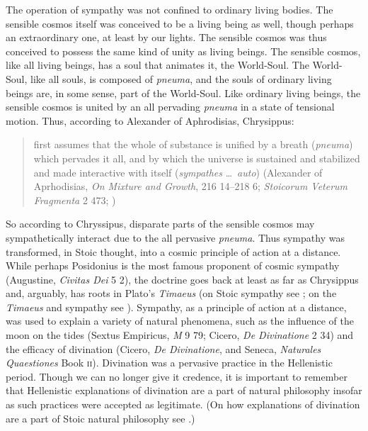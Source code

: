 The operation of sympathy was not confined to ordinary living bodies. The sensible cosmos itself was conceived to be a living being as well, though perhaps an extraordinary one, at least by our lights. The sensible cosmos was thus conceived to possess the same kind of unity as living beings. The sensible cosmos, like all living beings, has a soul that animates it, the World-Soul. The World-Soul, like all souls, is composed of \emph{pneuma}, and the souls of ordinary living beings are, in some sense, part of the World-Soul. Like ordinary living beings, the sensible cosmos is united by an all pervading \emph{pneuma} in a state of tensional motion. Thus, according to Alexander of Aphrodisias, Chrysippus: 
\begin{quote}
	first assumes that the whole of substance is unified by a breath (\emph{pneuma}) which pervades it all, and by which the universe is sustained and stabilized and made interactive with itself (\emph{sympathes} \ldots\ \emph{auto}) (Alexander of Aprhodisias, \emph{On Mixture and Growth}, 216 14--218 6; \emph{Stoicorum Veterum Fragmenta} 2 473; \citealt[48 C]{Long:1987aa})
\end{quote}
So according to Chryssipus, disparate parts of the sensible cosmos may sympathetically interact due to the all pervasive \emph{pneuma}.  Thus sympathy was transformed, in Stoic thought, into a cosmic principle of action at a distance. While perhaps Posidonius is the most famous proponent of cosmic sympathy (Augustine, \emph{Civitas Dei} 5 2), the doctrine goes back at least as far as Chrysippus and, arguably, has roots in Plato's \emph{Timaeus} (on Stoic sympathy see \citealt{Sambursky:1959ms,Meyer:2009xp,Brouwer:2015ee}; on the \emph{Timaeus} and sympathy see \citealt{Emilsson:2015wf}). Sympathy, as a principle of action at a distance, was used to explain a variety of natural phenomena, such as the influence of the moon on the tides (Sextus Empiricus, \emph{M} 9 79; Cicero, \emph{De Divinatione} 2 34) and the efficacy of divination (Cicero, \emph{De Divinatione}, and Seneca, \emph{Naturales Quaestiones} Book \textsc{ii}). Divination was a pervasive practice in the Hellenistic period. Though we can no longer give it credence, it is important to remember that Hellenistic explanations of divination are a part of natural philosophy insofar as such practices were accepted as legitimate. (On how explanations of divination are a part of Stoic natural philosophy see \citealt{Struck:2007aa}.)



